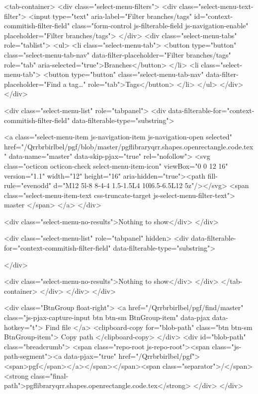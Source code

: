       <tab-container>
      <div class="select-menu-filters">
        <div class="select-menu-text-filter">
          <input type="text" aria-label="Filter branches/tags" id="context-commitish-filter-field" class="form-control js-filterable-field js-navigation-enable" placeholder="Filter branches/tags">
        </div>
        <div class="select-menu-tabs" role="tablist">
          <ul>
            <li class="select-menu-tab">
              <button type="button" class="select-menu-tab-nav" data-filter-placeholder="Filter branches/tags" role="tab" aria-selected="true">Branches</button>
            </li>
            <li class="select-menu-tab">
              <button type="button" class="select-menu-tab-nav" data-filter-placeholder="Find a tag…" role="tab">Tags</button>
            </li>
          </ul>
        </div>
      </div>

      <div class="select-menu-list" role="tabpanel">
        <div data-filterable-for="context-commitish-filter-field" data-filterable-type="substring">


            <a class="select-menu-item js-navigation-item js-navigation-open selected"
               href="/Qrrbrbirlbel/pgf/blob/master/pgflibraryqrr.shapes.openrectangle.code.tex"
               data-name="master"
               data-skip-pjax="true"
               rel="nofollow">
              <svg class="octicon octicon-check select-menu-item-icon" viewBox="0 0 12 16" version="1.1" width="12" height="16" aria-hidden="true"><path fill-rule="evenodd" d="M12 5l-8 8-4-4 1.5-1.5L4 10l6.5-6.5L12 5z"/></svg>
              <span class="select-menu-item-text css-truncate-target js-select-menu-filter-text">
                master
              </span>
            </a>
        </div>

          <div class="select-menu-no-results">Nothing to show</div>
      </div>

      <div class="select-menu-list" role="tabpanel" hidden>
        <div data-filterable-for="context-commitish-filter-field" data-filterable-type="substring">


        </div>

        <div class="select-menu-no-results">Nothing to show</div>
      </div>
      </tab-container>
    </div>
  </div>
</div>

      <div class="BtnGroup float-right">
        <a href="/Qrrbrbirlbel/pgf/find/master"
              class="js-pjax-capture-input btn btn-sm BtnGroup-item"
              data-pjax
              data-hotkey="t">
          Find file
        </a>
        <clipboard-copy for="blob-path" class="btn btn-sm BtnGroup-item">
          Copy path
        </clipboard-copy>
      </div>
      <div id="blob-path" class="breadcrumb">
        <span class="repo-root js-repo-root"><span class="js-path-segment"><a data-pjax="true" href="/Qrrbrbirlbel/pgf"><span>pgf</span></a></span></span><span class="separator">/</span><strong class="final-path">pgflibraryqrr.shapes.openrectangle.code.tex</strong>
      </div>
    </div>


